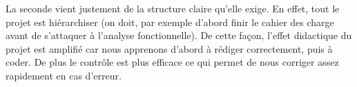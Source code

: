 La seconde vient justement de la structure claire qu'elle exige. 
En effet, tout le projet est hiérarchiser (on doit, par exemple d'abord finir le cahier des charge avant de s'attaquer à l'analyse fonctionnelle). 
De cette façon, l'effet didactique du projet est amplifié car nous apprenons d'abord à rédiger correctement, puis à coder. 
De plus le contrôle est plus efficace ce qui permet de nous corriger assez rapidement en cas d'erreur.
